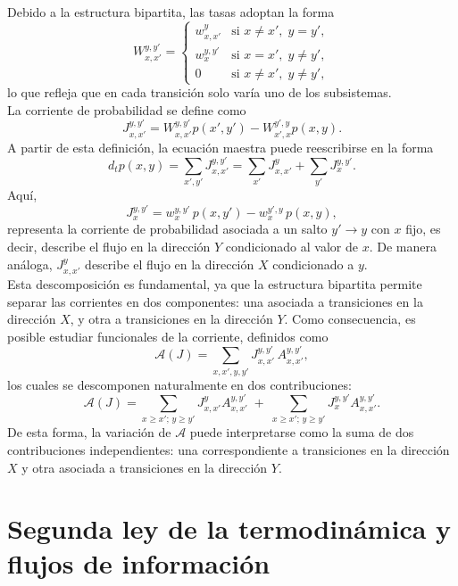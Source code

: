 Debido a la estructura bipartita, las tasas adoptan la forma
\[
W_{x,x'}^{y,y'} = 
\begin{cases}
w_{x,x'}^{y} & \text{si } x\neq x', \; y=y', \\[2mm]
w_{x}^{y,y'} & \text{si } x=x', \; y\neq y', \\[2mm]
0 & \text{si } x\neq x', \; y\neq y',
\end{cases}
\]
lo que refleja que en cada transición solo varía uno de los subsistemas.
\\

La corriente de probabilidad se define como
\[
J_{x,x'}^{y,y'} = W_{x,x'}^{y,y'}p(x',y') - W_{x',x}^{y',y}p(x,y).
\]
A partir de esta definición, la ecuación maestra puede reescribirse en la forma
\[
d_{t}p(x,y) = \sum_{x',y'}J_{x,x'}^{y,y'} = \sum_{x'}J_{x,x'}^{y} + \sum_{y'}J_{x}^{y,y'}.
\]
Aquí,
\[
J_{x}^{y,y'} = w_{x}^{y,y'}\,p(x,y') - w_{x}^{y',y}\,p(x,y),
\]
representa la corriente de probabilidad asociada a un salto \(y' \to y\) con \(x\) fijo, es decir, describe el flujo en la dirección \( Y \) condicionado al valor de \(x\). De manera análoga, \( J^{y}_{x,x'} \) describe el flujo en la dirección \( X \) condicionado a \(y\).  
\\

Esta descomposición es fundamental, ya que la estructura bipartita permite separar las corrientes en dos componentes: una asociada a transiciones en la dirección \(X\), y otra a transiciones en la dirección \(Y\). Como consecuencia, es posible estudiar funcionales de la corriente, definidos como
\[
\mathcal{A}(J) = \sum_{x,x',y,y'} J_{x,x'}^{y,y'}\, A_{x,x'}^{y,y'},
\]
los cuales se descomponen naturalmente en dos contribuciones:
\begin{equation}
\mathcal{A}(J) = \sum_{x\geq x';\,y\geq y'} J_{x,x'}^{y}A_{x,x'}^{y,y'} \;+\; \sum_{x\geq x';\,y\geq y'} J_{x}^{y,y'} A_{x,x'}^{y,y'}.
\label{sec4:functionalcurrent}
\end{equation}
De esta forma, la variación de \(\mathcal{A}\) puede interpretarse como la suma de dos contribuciones independientes: una correspondiente a transiciones en la dirección \(X\) y otra asociada a transiciones en la dirección \(Y\).

\label{sec4:flujos}
\section{Segunda ley de la termodinámica y flujos de información}

